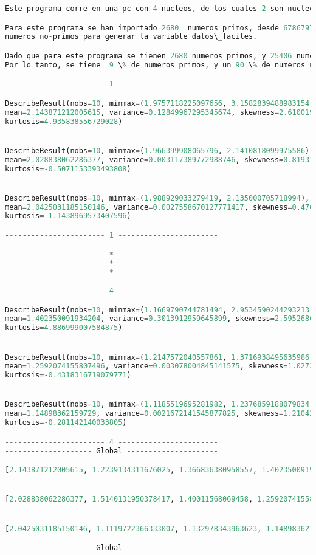 \documentclass{article}
\begin{document}
\begin{lstlisting}[language=Python]



Este programa corre en una pc con 4 nucleos, de los cuales 2 son nucleos virtuales.

Para este programa se han importado 2680  numeros primos, desde 67867979 hasta 67916099  lo que conforma la variable datos. De esta variable se han obtenido los intervalos de 
numeros no-primos para generar la variable datos\_faciles.

Dado que para este programa se tienen 2680 numeros primos, y 25406 numeros no-primos. 
Por lo tanto, se tiene  9 \% de numeros primos, y un 90 \% de numeros no-primos.

----------------------- 1 -----------------------

DescribeResult(nobs=10, minmax=(1.9757118225097656, 3.1582839488983154), 
mean=2.143871212005615, variance=0.12849967295345674, skewness=2.6100195577759018, 
kurtosis=4.935838556729028)


DescribeResult(nobs=10, minmax=(1.966399908065796, 2.1410818099975586), 
mean=2.028838062286377, variance=0.003117389772988746, skewness=0.8193194321308167, 
kurtosis=-0.5071153393493808)


DescribeResult(nobs=10, minmax=(1.988929033279419, 2.135000705718994), 
mean=2.0425031185150146, variance=0.0027558670127771417, skewness=0.47033095855467855, 
kurtosis=-1.1438969573407596)

----------------------- 1 -----------------------

                        *
                        *
                        *
                        
----------------------- 4 -----------------------

DescribeResult(nobs=10, minmax=(1.1669790744781494, 2.9534590244293213), 
mean=1.402350091934204, variance=0.3013912959645899, skewness=2.5952686648917624, 
kurtosis=4.886999007584875)


DescribeResult(nobs=10, minmax=(1.2147572040557861, 1.3716938495635986), 
mean=1.2592074155807496, variance=0.003078004845141575, skewness=1.027304362865847, 
kurtosis=-0.4318316719079771)


DescribeResult(nobs=10, minmax=(1.1185519695281982, 1.2376859188079834), 
mean=1.14898362159729, variance=0.0021672141545877825, skewness=1.2104278873436451, 
kurtosis=-0.281142140033805)

----------------------- 4 -----------------------
-------------------- Global ---------------------

[2.143871212005615, 1.2239134311676025, 1.366836380958557, 1.402350091934204]


[2.028838062286377, 1.5140131950378417, 1.40011568069458, 1.2592074155807496]


[2.0425031185150146, 1.1119722366333007, 1.132978343963623, 1.14898362159729]

-------------------- Global ---------------------
 \end{lstlisting}
\end{document}
